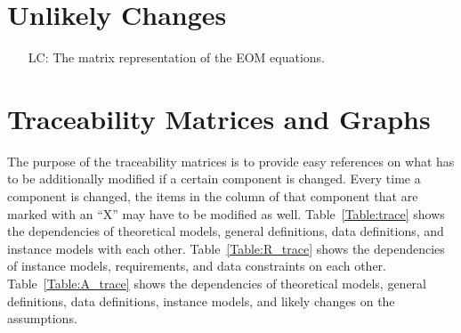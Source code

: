 \documentclass[12pt]{article}
\newcounter{lcnum} %
\begin{document}
\section{Unlikely Changes}    

\noindent \begin{itemize}
	
	\item[LC\refstepcounter{lcnum}\thelcnum\label{LC_matrix}:] The matrix 
	representation of the EOM equations.
	
\end{itemize}

\section{Traceability Matrices and Graphs}

The purpose of the traceability matrices is to provide easy references on what
has to be additionally modified if a certain component is changed.  Every time a
component is changed, the items in the column of that component that are marked
with an ``X'' may have to be modified as well.  Table~\ref{Table:trace} shows the
dependencies of theoretical models, general definitions, data definitions, and
instance models with each other. Table~\ref{Table:R_trace} shows the
dependencies of instance models, requirements, and data constraints on each
other. Table~\ref{Table:A_trace} shows the dependencies of theoretical models,
general definitions, data definitions, instance models, and likely changes on
the assumptions.
\end{document}
